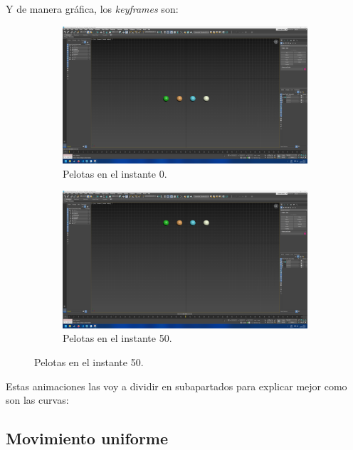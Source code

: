 \documentclass{article}
\begin{document}
Y de manera gráfica, los \textit{keyframes} son:

\begin{figure}[H]
    \centering 
	\begin{subfigure}[H]{0.48\textwidth}
	    \centering
	    \includegraphics[width=\textwidth]{imagenes/Ejercicio 1/keyframes/0.png}
        \caption{Pelotas en el instante 0.}
    \end{subfigure}
    \hfill
	\begin{subfigure}[H]{0.48\textwidth}
	    \centering
	    \includegraphics[width=\textwidth]{imagenes/Ejercicio 1/keyframes/50.png}
        \caption{Pelotas en el instante 50.}
    \end{subfigure}    
\end{figure}

\bigskip

Estas animaciones las voy a dividir en subapartados para explicar mejor como son las curvas:

\subsection{Movimiento uniforme}
\end{document}
